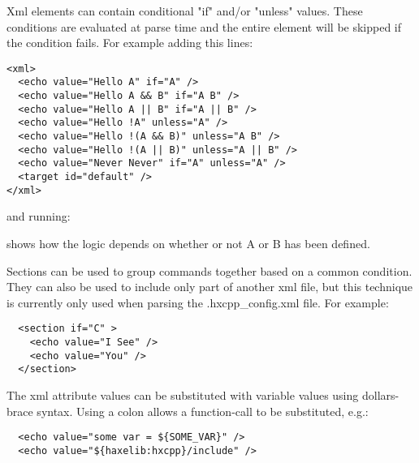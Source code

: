 Xml elements can contain conditional "if" and/or "unless" values.  These conditions are evaluated at parse time and the entire element will be skipped if the condition fails.  For example adding this lines:
\begin{lstlisting}
<xml>
  <echo value="Hello A" if="A" />
  <echo value="Hello A && B" if="A B" />
  <echo value="Hello A || B" if="A || B" />
  <echo value="Hello !A" unless="A" />
  <echo value="Hello !(A && B)" unless="A B" />
  <echo value="Hello !(A || B)" unless="A || B" />
  <echo value="Never Never" if="A" unless="A" />
  <target id="default" />
</xml>
\end{lstlisting}

and running:


shows how the logic depends on whether or not A or B has been defined.

Sections can be used to group commands together based on a common condition.  They can also be used to include only part of another xml file, but this technique is currently only used when parsing the .hxcpp_config.xml file.  For example:

\begin{lstlisting}
  <section if="C" >
    <echo value="I See" />
    <echo value="You" />
  </section>
\end{lstlisting}

The xml attribute values can be substituted with variable values using dollars-brace syntax.  Using a colon allows a function-call to be substituted, e.g.:

\begin{lstlisting}
  <echo value="some var = ${SOME_VAR}" />
  <echo value="${haxelib:hxcpp}/include" />
\end{lstlisting}


